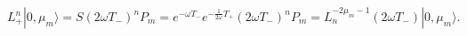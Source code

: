 \begin{equation}
	L_{+}^{n}|0,\mu_{m}\rangle=S(2\omega T_{-})^{n} P_{m}=
	e^{-\omega T_{-}} e^{-\frac{1}{2\omega} T_{+}} 
	(2\omega T_{-})^{n} P_{m}=
	L_{n}^{-2\mu_{m}-1} (2\omega T_{-}) |0,\mu_{m}\rangle .
\end{equation} 
